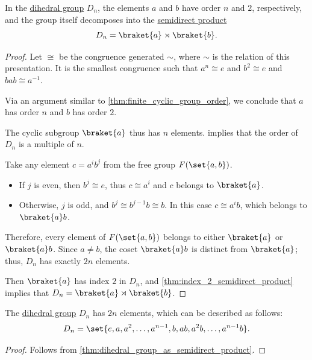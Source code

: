\begin{proposition}\label{thm:dihedral_group_as_semidirect_product}
  In the \hyperref[def:dihedral_group]{dihedral group} \( D_n \), the elements \( a \) and \( b \) have order \( n \) and \( 2 \), respectively, and the group itself decomposes into the \hyperref[def:internal_semidirect_product]{semidirect product}
  \begin{equation*}
    D_n = \braket{ a } \rtimes \braket{ b }.
  \end{equation*}
\end{proposition}
\begin{proof}
  Let \( {\cong} \) be the congruence generated \( {\sim} \), where \( {\sim} \) is the relation of this presentation. It is the smallest congruence such that \( a^n \cong e \) and \( b^2 \cong e \) and \( bab \cong a^{-1} \).

  Via an argument similar to \cref{thm:finite_cyclic_group_order}, we conclude that \( a \) has order \( n \) and \( b \) has order \( 2 \).

  The cyclic subgroup \( \braket{ a } \) thus has \( n \) elements.  implies that the order of \( D_n \) is a multiple of \( n \).

  Take any element \( c = a^i b^j \) from the free group \( F(\set{ a, b }) \).
  \begin{itemize}
    \item If \( j \) is even, then \( b^j \cong e \), thus \( c \cong a^i \) and \( c \) belongs to \( \braket{ a } \).
    \item Otherwise, \( j \) is odd, and \( b^j \cong b^{j-1} b \cong b \). In this case \( c \cong a^i b \), which belongs to \( \braket{ a } b \).
  \end{itemize}

  Therefore, every element of \( F(\set{ a, b }) \) belongs to either \( \braket{ a } \) or \( \braket{ a } b \). Since \( a \neq b \), the coset \( \braket{ a } b \) is distinct from \( \braket{ a } \); thus, \( D_n \) has exactly \( 2n \) elements.

  Then \( \braket{ a } \) has index \( 2 \) in \( D_n \), and \cref{thm:index_2_semidirect_product} implies that \( D_n = \braket{ a } \rtimes \braket{ b } \).
\end{proof}

\begin{corollary}\label{thm:dihedral_group_explicit}
  The \hyperref[def:dihedral_group]{dihedral group} \( D_n \) has \( 2n \) elements, which can be described as follows:
  \begin{equation*}
    D_n = \set{ e, a, a^2, \ldots, a^{n-1}, b, ab, a^2b, \ldots, a^{n-1}b }.
  \end{equation*}
\end{corollary}
\begin{proof}
  Follows from \cref{thm:dihedral_group_as_semidirect_product}.
\end{proof}

